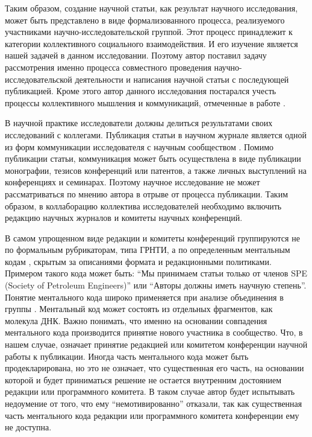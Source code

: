 Таким образом, создание научной статьи, как результат научного исследования, может быть представлено в виде формализованного процесса, реализуемого участниками научно-исследовательской группой. Этот процесс принадлежит к категории коллективного социального взаимодействия. И его изучение является нашей задачей в данном исследовании. Поэтому автор поставил задачу рассмотрения именно процесса совместного проведения научно-исследовательской деятельности и написания научной статьи с последующей публикацией. Кроме этого автор данного исследования постарался учесть процессы коллективного мышления и коммуникаций, отмеченные в работе \cite{mkrt1995f}.

В научной практике исследователи должны делиться результатами своих исследований с коллегами. Публикация статьи в научном журнале является одной из форм коммуникации исследователя с научным сообществом \cite{danil2016o}. Помимо публикации статьи, коммуникация может быть осуществлена в виде публикации монографии, тезисов конференций или патентов, а также личных выступлений на конференциях и семинарах. Поэтому научное исследование не может рассматриваться по мнению автора в отрыве от процесса публикации. Таким образом, в коллаборацию коллектива исследователей необходимо включить редакцию научных журналов и комитеты научных конференций.

В самом упрощенном виде редакции и комитеты конференций группируются не по формальным рубрикаторам, типа ГРНТИ, а по определенным ментальным кодам \cite{gary2016unpacking}, скрытым за описаниями формата и редакционными политиками. Примером такого кода может быть: ``Мы принимаем статьи только от членов SPE (Society of Petroleum Engineers)'' или ``Авторы должны иметь научную степень''. Понятие ментального кода широко применяется при анализе объединения в группы \cite{sidor2006g,gentner2014mental}. 
Ментальный код может состоять из отдельных фрагментов, как молекула ДНК. Важно понимать, что именно на основании совпадения ментального кода производится принятие нового участника в сообщество. Что, в нашем случае, означает принятие редакцией или комитетом конференции научной работы к публикации. Иногда часть ментального кода может быть продекларирована, но это не означает, что существенная его часть, на основании которой и будет приниматься решение не остается внутренним достоянием редакции или программного комитета. В таком случае автор будет испытывать недоумение от того, что ему ``немотивированно'' отказали, так как существенная часть ментального кода редакции или программного комитета конференции ему не доступна.


